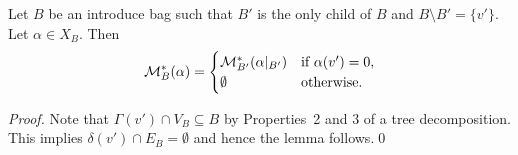 \documentclass{llncs}
\begin{document}
\begin{lemma}\label{lem:introduce}
	Let $B$ be an introduce bag such that $B'$ is the only child of $B$ and $B \setminus B' = \{v'\}$. Let $\alpha \in X_B$. Then
	 \begin{align*}
	   \mathcal{M}^*_B(\alpha) = \begin{cases}
	    \mathcal{M}^*_{B'}(\alpha|_{B'}) & \textup{if } \alpha(v') = 0,\\
	    \emptyset & \textup{otherwise.}
	  \end{cases}
	\end{align*}
\end{lemma}
\begin{proof}
  Note that $\Gamma(v') \cap V_B \subseteq B$ by Properties~2 and 3 of a tree decomposition. This implies $\delta(v') \cap E_B = \emptyset$ and hence the lemma follows.\qed
\end{proof}
\end{document}
